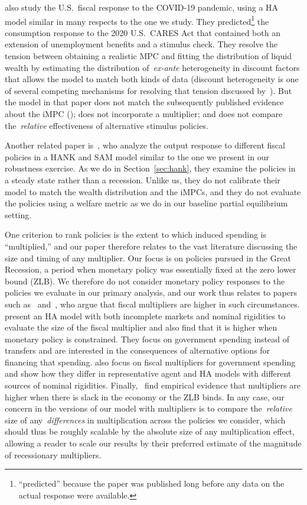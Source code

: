 \documentclass[qe]{econsocart}
\begin{document}
\cite{carroll2020modeling} also study the U.S.\ fiscal response to the COVID-19 pandemic, using a HA model similar in many respects to the one we study.  They predicted\footnote{``predicted'' because the paper was published long before any data on the actual response were available.} the consumption response to the 2020 U.S.\ CARES Act  that contained both an extension of unemployment benefits and a stimulus check.
They resolve the tension between obtaining a realistic MPC and fitting the distribution of liquid wealth by estimating the distribution of~\textit{ex-ante} heterogeneity in discount factors that allows the model to match both kinds of data (discount heterogeneity is one of several competing mechanisms for resolving that tension discussed by~\cite{kaplanMPC2022}).
But the model in that paper does not match the subsequently published evidence about the iMPC (\cite{fagereng-mpc-2021}); does not incorporate a multiplier; and does not compare the~\textit{relative} effectiveness of alternative stimulus policies.

Another related paper is~\cite{broer2025stimulus}, who analyze the output response to different fiscal policies in a HANK and SAM model similar to the one we present in our robustness exercise. As we do in Section~\ref{sec:hank}, they examine the policies in a steady state rather than a recession. Unlike us, they do not calibrate their model to match the wealth distribution and the iMPCs, and they do not evaluate the policies using a welfare metric as we do in our baseline partial equilibrium setting.

One criterion to rank policies is the extent to which induced spending is ``multiplied,'' and our paper therefore relates to the vast literature discussing the size and timing of any multiplier.
Our focus is on policies pursued in the Great Recession, a period when monetary policy was essentially fixed at the zero lower bound (ZLB).
We therefore do not consider monetary policy responses to the policies we evaluate in our primary analysis, and our work thus relates to papers such as~\cite{christiano2011government} and~\cite{eggertsson2011fiscal}, who argue that fiscal multipliers are higher in such circumstances.
\cite{hagedorn2019fiscal} present an HA model with both incomplete markets and nominal rigidities to evaluate the size of the fiscal multiplier and also find that it is higher when monetary policy is constrained.  They focus on government spending instead of transfers and are interested in the consequences of alternative options for financing that spending.
\cite{broer2023fiscalmultipliers} also focus on fiscal multipliers for government spending and show how they differ in representative agent and HA models with different sources of nominal rigidities.
Finally,~\cite{ramey2018government} find empirical evidence that multipliers are higher when there is slack in the economy or the ZLB binds.  
In any case, our concern in the versions of our model with multipliers is to compare the~\textit{relative} size of any~\textit{differences} in multiplication across the policies we consider, which should thus be roughly scalable by the absolute size of any multiplication effect, allowing a reader to scale our results by their preferred estimate of the magnitude of recessionary multipliers.
\end{document}
